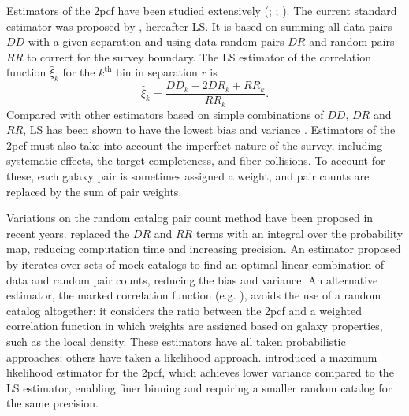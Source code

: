 \documentclass[modern]{aastex62}
\newcommand{\cf}{2pcf\xspace} %
\newcommand{\LS}{LS\xspace}
\begin{document}
Estimators of the \cf have been studied extensively (\citealt{PeeblesHauser1974}; \citealt{DavisPeebles1983}; \citealt{Hamilton1993}).
The current standard estimator was proposed by \cite{LandySzalay1993}, hereafter \LS. It is based on summing all data pairs $DD$ with a given separation and using data-random pairs $DR$ and random pairs $RR$ to correct for the survey boundary. The \LS estimator of the correlation function $\hat{\xi}_k$ for the $k^\mathrm{th}$ bin in separation $r$ is
\begin{equation} \label{eq:lsintro}
\hat{\xi}_k = \frac{DD_k - 2DR_k + RR_k}{RR_k}.
\end{equation}
Compared with other estimators based on simple combinations of $DD$, $DR$ and $RR$, \LS has been shown to have the lowest bias and variance \citep{Kerscher2000}.
Estimators of the \cf must also take into account the imperfect nature of the survey, including systematic effects, the target completeness, and fiber collisions.
To account for these, each galaxy pair is sometimes assigned a weight, and pair counts are replaced by the sum of pair weights.

Variations on the random catalog pair count method have been proposed in recent years.
\cite{Demina2016} replaced the $DR$ and $RR$ terms with an integral over the probability map, reducing computation time and increasing precision.
An estimator proposed by \cite{VargasMagana2013} iterates over sets of mock catalogs to find an optimal linear combination of data and random pair counts, reducing the bias and variance.
An alternative estimator, the marked correlation function (e.g. \citealt{WhitePadmanabhan2009}), avoids the use of a random catalog altogether: it considers the ratio between the \cf and a weighted correlation function in which weights are assigned based on galaxy properties, such as the local density.
These estimators have all taken probabilistic approaches; others have taken a likelihood approach.
\cite{BaxterRozo2013} introduced a maximum likelihood estimator for the \cf, which achieves lower variance compared to the \LS estimator, enabling finer binning and requiring a smaller random catalog for the same precision.
\end{document}

